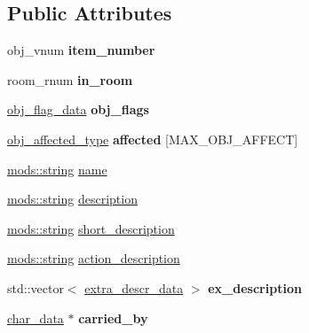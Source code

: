 \subsection*{Public Attributes}
\begin{DoxyCompactItemize}
\item 
\mbox{\label{structobj__data_a572bfc471d3b2d3708a64a28cea2414a}} 
obj\+\_\+vnum {\bfseries item\+\_\+number}
\item 
\mbox{\label{structobj__data_a0464ffd25b49d5616215edba9b113c95}} 
room\+\_\+rnum {\bfseries in\+\_\+room}
\item 
\mbox{\label{structobj__data_a4af50254c8919811dd9b3d55e3ff5113}} 
\hyperlink{structobj__flag__data}{obj\+\_\+flag\+\_\+data} {\bfseries obj\+\_\+flags}
\item 
\mbox{\label{structobj__data_a1abd39ad0e4c153fca53d84ec9abbd51}} 
\hyperlink{structobj__affected__type}{obj\+\_\+affected\+\_\+type} {\bfseries affected} \mbox{[}M\+A\+X\+\_\+\+O\+B\+J\+\_\+\+A\+F\+F\+E\+CT\mbox{]}
\item 
\hyperlink{structmods_1_1string}{mods\+::string} \hyperlink{structobj__data_a6a6eff873924a8df3aa0562c425e477b}{name}
\item 
\hyperlink{structmods_1_1string}{mods\+::string} \hyperlink{structobj__data_ac48d7cdab17efaf5e9664bbbf9a15ffb}{description}
\item 
\hyperlink{structmods_1_1string}{mods\+::string} \hyperlink{structobj__data_a38420e39fa29369569eab896fd57ded7}{short\+\_\+description}
\item 
\hyperlink{structmods_1_1string}{mods\+::string} \hyperlink{structobj__data_a2e18adda623112bbd517ebb765aa8110}{action\+\_\+description}
\item 
\mbox{\label{structobj__data_ae784731b0fa1cace5282cc2c25815b4a}} 
std\+::vector$<$ \hyperlink{structextra__descr__data}{extra\+\_\+descr\+\_\+data} $>$ {\bfseries ex\+\_\+description}
\item 
\mbox{\label{structobj__data_a5bfbda81f7aa541b1575c2e232990003}} 
\hyperlink{structchar__data}{char\+\_\+data} $\ast$ {\bfseries carried\+\_\+by}
\item 
\mbox{\label{structobj__data_ae4f7664746d3c926b6ccd3bc3d5f593c}} 

\end{DoxyCompactItemize}
